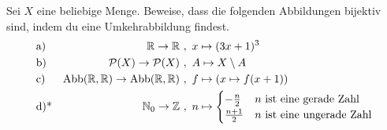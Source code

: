 \begin{aufg}[Umkehrfunktionen]
Sei $X$ eine beliebige Menge. Beweise, dass die folgenden Abbildungen bijektiv sind, indem du eine Umkehrabbildung findest.
\begin{align*}
 &\text{a)} &  \mathbb{R} \to  \mathbb{R}\ &,\ x\mapsto (3x+1)^3 \\
 &\text{b)} &  \mathcal{P}(X) \to  \mathcal{P}(X) \ &,\ A \mapsto X\setminus A \\
 &\text{c)} &  \text{Abb}(\Rz,\Rz) \to \text{Abb}(\Rz,\Rz) \ &,\ f \mapsto (x\mapsto f(x+1)) \\
 &\text{d)*} & \mathbb{N}_0 \to  \mathbb{Z}\ &,\ n\mapsto \begin{cases}
 -\frac{n}{2} & n\ \text{ist eine gerade Zahl} \\
 \frac{n+1}{2} & n\ \text{ist eine ungerade Zahl}
 \end{cases}
\end{align*}
\end{aufg}

